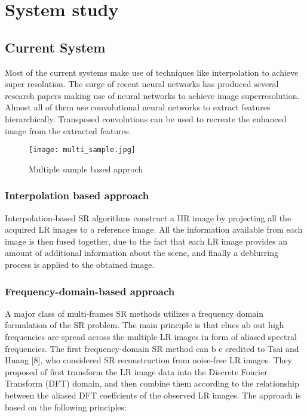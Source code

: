 \chapter{System study}

\section{Current System}
Most of the current systems make use of techniques like interpolation to achieve super resolution. The surge of recent neural networks has produced several research papers making use of neural networks to achieve image superresolution. Almost all of them use convolutional neural networks to extract features hierarchically. Transposed convolutions can be used to recreate the enhanced image from the extracted features.

\begin{figure}[htb]
    \centering
    \texttt{[image: multi\_sample.jpg]}
    \caption{Multiple sample based approch}
    \label{fig:ms} %
\end{figure}

\subsection{Interpolation based approach}
Interpolation-based SR algorithms construct a HR image by projecting all the acquired LR images to a reference image. All the information available from each image is then fused together, due to the fact that each LR image provides an amount of additional information about the scene, and finally a deblurring process is applied to the obtained image. 

\subsection{Frequency-domain-based approach}
A major class of multi-frames SR methods utilizes a frequency domain formulation of the SR problem. The main principle is that clues ab out high frequencies are spread across the multiple LR images in form of aliased spectral frequencies. The first frequency-domain SR method can b e credited to Tsai and Huang [8], who considered SR reconstruction from noise-free LR images. They proposed of first transform the LR image data into the Discrete Fourier Transform (DFT) domain, and then combine them according to the relationship between the aliased DFT coeffcients of the observed LR images. The approach is based on the following principles:

